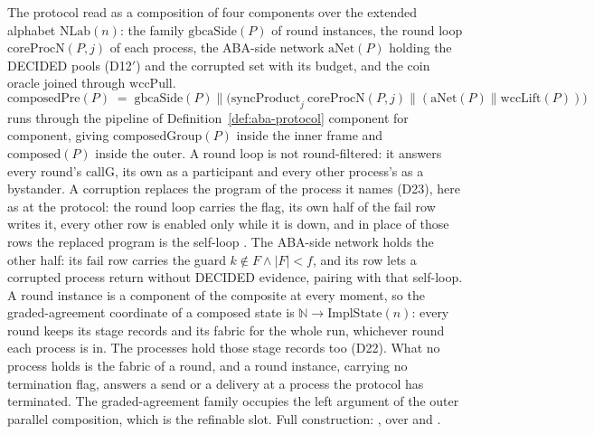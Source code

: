 \begin{definition}
  \label{def:aba-composed}
  \leanok
  The protocol read as a composition of four components over the extended alphabet $\mathrm{NLab}(n)$: the family $\mathrm{gbcaSide}(P)$ of round instances, the round loop $\mathrm{coreProcN}(P,j)$ of each process, the ABA-side network $\mathrm{aNet}(P)$ holding the DECIDED pools (D12$'$) and the corrupted set with its budget, and the coin oracle joined through $\mathrm{wccPull}$.
  \[
    \mathrm{composedPre}(P) \;=\;
      \mathrm{gbcaSide}(P) \parallel \bigl(\mathrm{syncProduct}_{j}\ \mathrm{coreProcN}(P,j)
        \parallel (\mathrm{aNet}(P) \parallel \mathrm{wccLift}(P))\bigr)
  \]
  runs through the pipeline of Definition~\ref{def:aba-protocol} component for component, giving $\mathrm{composedGroup}(P)$ inside the inner frame and $\mathrm{composed}(P)$ inside the outer.
  A round loop is not round-filtered: it answers every round's $\mathrm{callG}$, its own as a participant and every other process's as a bystander.
  A corruption replaces the program of the process it names (D23), here as at the protocol: the round loop carries the flag, its own half of the $\mathrm{fail}$ row writes it, every other row is enabled only while it is down, and in place of those rows the replaced program is the self-loop .
  The ABA-side network holds the other half: its $\mathrm{fail}$ row carries the guard $k \notin F \wedge |F| < f$, and its  row lets a corrupted process return without DECIDED evidence, pairing with that self-loop.
  A round instance is a component of the composite at every moment, so the graded-agreement coordinate of a composed state is $\mathbb{N} \to \mathrm{ImplState}(n)$: every round keeps its stage records and its fabric for the whole run, whichever round each process is in.
  The processes hold those stage records too (D22).
  What no process holds is the fabric of a round, and a round instance, carrying no termination flag, answers a send or a delivery at a process the protocol has terminated.
  The graded-agreement family occupies the left argument of the outer parallel composition, which is the refinable slot.
  Full construction: , over  and .
\end{definition}
